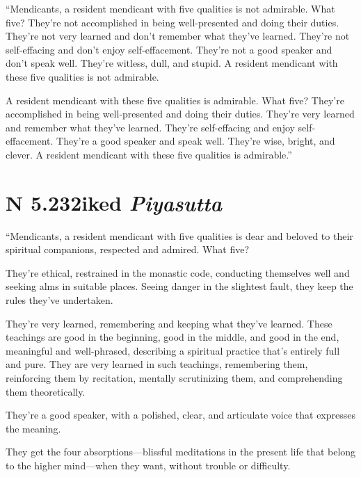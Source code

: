 \documentclass[12pt,openany]{book}%
\newcommand*{\suttatitleacronym}[1]{\smaller[2]{#1}\vspace*{.3em}}
\newcommand*{\suttatitletranslation}[1]{\linebreak{#1}}
\newcommand*{\suttatitleroot}[1]{\linebreak\smaller[2]\itshape{#1}}
\newcommand*{\tocacronym}[1]{\hspace*{-3.3em}{#1}\quad}
\newcommand*{\toctranslation}[1]{#1}
\newcommand*{\tocroot}[1]{(\textit{#1})}
\begin{document}
“Mendicants, a resident mendicant with five qualities is not admirable. What five? They’re not accomplished in being well-presented and doing their duties. They’re not very learned and don’t remember what they’ve learned. They’re not self-effacing and don’t enjoy self-effacement. They’re not a good speaker and don’t speak well. They’re witless, dull, and stupid. A resident mendicant with these five qualities is not admirable. 

A resident mendicant with these five qualities is admirable. What five? They’re accomplished in being well-presented and doing their duties. They’re very learned and remember what they’ve learned. They’re self-effacing and enjoy self-effacement. They’re a good speaker and speak well. They’re wise, bright, and clever. A resident mendicant with these five qualities is admirable.” 

%
\section*{{\suttatitleacronym AN 5.232}{\suttatitletranslation Liked }{\suttatitleroot Piyasutta}}
\addcontentsline{toc}{section}{\tocacronym{AN 5.232} \toctranslation{Liked } \tocroot{Piyasutta}}

“Mendicants, a resident mendicant with five qualities is dear and beloved to their spiritual companions, respected and admired. What five? 

They’re ethical, restrained in the monastic code, conducting themselves well and seeking alms in suitable places. Seeing danger in the slightest fault, they keep the rules they’ve undertaken. 

They’re very learned, remembering and keeping what they’ve learned. These teachings are good in the beginning, good in the middle, and good in the end, meaningful and well-phrased, describing a spiritual practice that’s entirely full and pure. They are very learned in such teachings, remembering them, reinforcing them by recitation, mentally scrutinizing them, and comprehending them theoretically. 

They’re a good speaker, with a polished, clear, and articulate voice that expresses the meaning. 

They get the four absorptions—blissful meditations in the present life that belong to the higher mind—when they want, without trouble or difficulty. 
\end{document}
